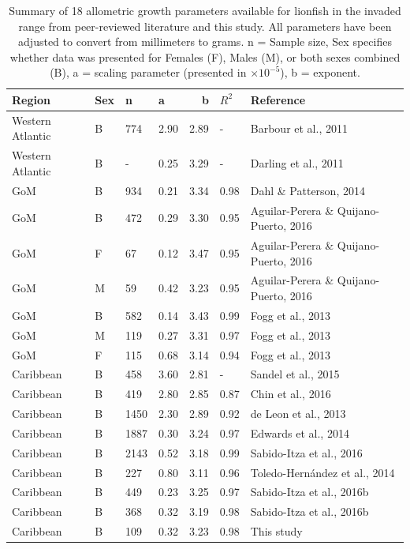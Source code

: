 \documentclass[fleqn,10pt,lineno]{wlpeerj} %
\begin{document}
\begin{table}[!h]

\caption{\label{tab:unnamed-chunk-2}\label{tab:all_params}Summary of 18 allometric growth parameters available for lionfish in the invaded range from peer-reviewed literature and this study. All parameters have been adjusted to convert from millimeters to grams. n = Sample size, Sex specifies whether data was presented for Females (F), Males (M), or both sexes combined (B), a = scaling parameter (presented in $\times 10^{-5}$), b = exponent.}
\centering
\begin{tabular}{llllrll}
\toprule
Region & Sex & n & a & b & $R^2$ & Reference\\
\midrule
Western Atlantic & B & 774 & 2.90 & 2.89 & - & Barbour et al., 2011\\
Western Atlantic & B & - & 0.25 & 3.29 & - & Darling et al., 2011\\
GoM & B & 934 & 0.21 & 3.34 & 0.98 & Dahl \& Patterson, 2014\\
GoM & B & 472 & 0.29 & 3.30 & 0.95 & Aguilar-Perera \& Quijano-Puerto, 2016\\
GoM & F & 67 & 0.12 & 3.47 & 0.95 & Aguilar-Perera \& Quijano-Puerto, 2016\\
GoM & M & 59 & 0.42 & 3.23 & 0.95 & Aguilar-Perera \& Quijano-Puerto, 2016\\
GoM & B & 582 & 0.14 & 3.43 & 0.99 & Fogg et al., 2013\\
GoM & M & 119 & 0.27 & 3.31 & 0.97 & Fogg et al., 2013\\
GoM & F & 115 & 0.68 & 3.14 & 0.94 & Fogg et al., 2013\\
Caribbean & B & 458 & 3.60 & 2.81 & - & Sandel et al., 2015\\
Caribbean & B & 419 & 2.80 & 2.85 & 0.87 & Chin et al., 2016\\
Caribbean & B & 1450 & 2.30 & 2.89 & 0.92 & de Leon et al., 2013\\
Caribbean & B & 1887 & 0.30 & 3.24 & 0.97 & Edwards et al., 2014\\
Caribbean & B & 2143 & 0.52 & 3.18 & 0.99 & Sabido-Itza et al., 2016\\
Caribbean & B & 227 & 0.80 & 3.11 & 0.96 & Toledo-Hernández et al., 2014\\
Caribbean & B & 449 & 0.23 & 3.25 & 0.97 & Sabido-Itza et al., 2016b\\
Caribbean & B & 368 & 0.32 & 3.19 & 0.98 & Sabido-Itza et al., 2016b\\
Caribbean & B & 109 & 0.32 & 3.23 & 0.98 & This study\\
\bottomrule
\end{tabular}
\end{table}
\end{document}
